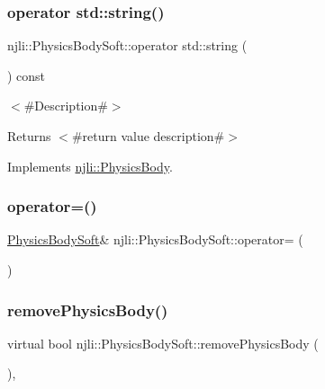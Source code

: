 \subsubsection{\texorpdfstring{operator std\+::string()}{operator std::string()}}
{\footnotesize\ttfamily njli\+::\+Physics\+Body\+Soft\+::operator std\+::string (\begin{DoxyParamCaption}{ }\end{DoxyParamCaption}) const\hspace{0.3cm}{\ttfamily [virtual]}}

$<$\#\+Description\#$>$

\begin{DoxyReturn}{Returns}
$<$\#return value description\#$>$ 
\end{DoxyReturn}


Implements \mbox{\hyperlink{classnjli_1_1_physics_body_a0c12067445dfd7893e37052ae90a9173}{njli\+::\+Physics\+Body}}.

\mbox{\label{classnjli_1_1_physics_body_soft_af1ab4b5f7f7e8ebea26e5b8302cad734}} 
\subsubsection{\texorpdfstring{operator=()}{operator=()}}
{\footnotesize\ttfamily \mbox{\hyperlink{classnjli_1_1_physics_body_soft}{Physics\+Body\+Soft}}\& njli\+::\+Physics\+Body\+Soft\+::operator= (\begin{DoxyParamCaption}\item[{const \mbox{\hyperlink{classnjli_1_1_physics_body_soft}{Physics\+Body\+Soft}} \&}]{ }\end{DoxyParamCaption})\hspace{0.3cm}{\ttfamily [protected]}}

\mbox{\label{classnjli_1_1_physics_body_soft_adce1993fe1287488cc5cb42b30a09bcc}} 
\subsubsection{\texorpdfstring{remove\+Physics\+Body()}{removePhysicsBody()}}
{\footnotesize\ttfamily virtual bool njli\+::\+Physics\+Body\+Soft\+::remove\+Physics\+Body (\begin{DoxyParamCaption}{ }\end{DoxyParamCaption})\hspace{0.3cm}{\ttfamily [protected]}, {\ttfamily [virtual]}}



